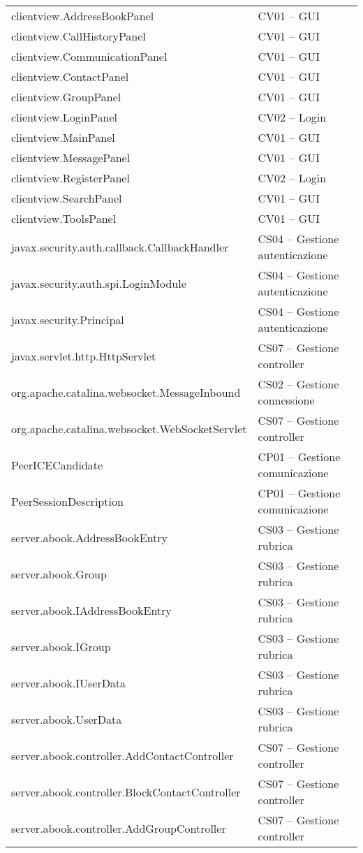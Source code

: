 \begin{center}
\begin{longtable}{lp{}l}
clientview.AddressBookPanel & CV01 -- GUI\\
clientview.CallHistoryPanel & CV01 -- GUI\\
clientview.CommunicationPanel & CV01 -- GUI\\
clientview.ContactPanel & CV01 -- GUI\\
clientview.GroupPanel & CV01 -- GUI\\
clientview.LoginPanel & CV02 -- Login\\
clientview.MainPanel & CV01 -- GUI\\
clientview.MessagePanel & CV01 -- GUI\\
clientview.RegisterPanel & CV02 -- Login\\
clientview.SearchPanel & CV01 -- GUI\\
clientview.ToolsPanel & CV01 -- GUI\\
javax.security.auth.callback.CallbackHandler & CS04 -- Gestione autenticazione\\
javax.security.auth.spi.LoginModule & CS04 -- Gestione autenticazione\\
javax.security.Principal & CS04 -- Gestione autenticazione\\
javax.servlet.http.HttpServlet & CS07 -- Gestione controller\\
org.apache.catalina.websocket.MessageInbound & CS02 -- Gestione connessione\\
org.apache.catalina.websocket.WebSocketServlet & CS07 -- Gestione controller\\
PeerICECandidate & CP01 -- Gestione comunicazione\\
PeerSessionDescription & CP01 -- Gestione comunicazione\\
server.abook.AddressBookEntry & CS03 -- Gestione rubrica\\
server.abook.Group & CS03 -- Gestione rubrica\\
server.abook.IAddressBookEntry& CS03 -- Gestione rubrica\\
server.abook.IGroup & CS03 -- Gestione rubrica\\
server.abook.IUserData & CS03 -- Gestione rubrica\\
server.abook.UserData & CS03 -- Gestione rubrica\\
server.abook.controller.AddContactController & CS07 -- Gestione controller\\
server.abook.controller.BlockContactController & CS07 -- Gestione controller\\
server.abook.controller.AddGroupController & CS07 -- Gestione controller\\

\end{longtable}
\end{center}
